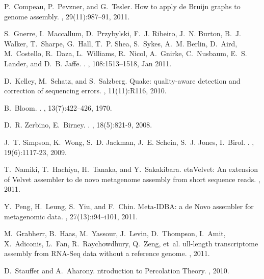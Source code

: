 \documentclass{pnastwo}
\begin{document}
\begin{article}
\begin{thebibliography}{10}
P.~Compeau, P.~Pevzner, and G.~Tesler.
\newblock How to apply de {B}ruijn graphs to genome assembly.
, 29(11):987--91, 2011.

S.~Gnerre, I.~Maccallum, D.~Przybylski, F.~J. Ribeiro, J.~N. Burton, B.~J.
  Walker, T.~Sharpe, G.~Hall, T.~P. Shea, S.~Sykes, A.~M. Berlin, D.~Aird,
  M.~Costello, R.~Daza, L.~Williams, R.~Nicol, A.~Gnirke, C.~Nusbaum, E.~S.
  Lander, and D.~B. Jaffe.
.
, 108:1513--1518, Jan 2011.

D.~Kelley, M.~Schatz, and S.~Salzberg.
\newblock Quake: quality-aware detection and correction of sequencing errors.
, 11(11):R116, 2010.

B.~Bloom.
.
, 13(7):422--426, 1970.

D.~R. Zerbino, E.~Birney.
.
, 18(5):821-9, 2008.

J.~T. Simpson, K.~Wong, S.~D. Jackman, J.~E. Schein, S.~J. Jones, I.~Birol.
.
, 19(6):1117-23, 2009.

T.~Namiki, T.~Hachiya, H.~Tanaka, and Y.~Sakakibara.
eta{V}elvet: {A}n extension of {V}elvet assembler to de novo
  metagenome assembly from short sequence reads.
, 2011.

Y.~Peng, H.~Leung, S.~Yiu, and F.~Chin.
\newblock Meta-IDBA: a de Novo assembler for metagenomic data.
, 27(13):i94--i101, 2011.

M.~Grabherr, B.~Haas, M.~Yassour, J.~Levin, D.~Thompson, I.~Amit, X.~Adiconis,
  L.~Fan, R.~Raychowdhury, Q.~Zeng, et~al.
ull-length transcriptome assembly from {R}{N}{A}-{S}eq data
  without a reference genome.
, 2011.

D.~Stauffer and A.~Aharony.
ntroduction to {P}ercolation {T}heory.
, 2010.


\end{thebibliography}
\end{article}
\end{document}
